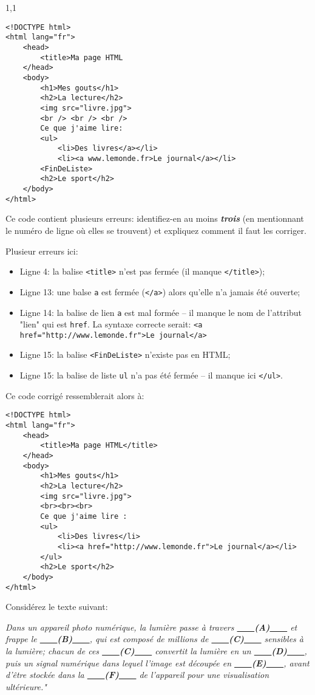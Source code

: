 \documentclass[11pt,a4paper]{exam}
\begin{document}
\begin{spacing}{1,1}
\begin{questions}
\begin{lstlisting}
<!DOCTYPE html>
<html lang="fr">
    <head>
        <title>Ma page HTML
    </head>
    <body>
        <h1>Mes gouts</h1>
        <h2>La lecture</h2>
        <img src="livre.jpg">
        <br /> <br /> <br />
        Ce que j'aime lire:
        <ul>
            <li>Des livres</a></li>
            <li><a www.lemonde.fr>Le journal</a></li>
        <FinDeListe>
        <h2>Le sport</h2>
    </body>
</html>
        	\end{lstlisting}
        		Ce code contient plusieurs erreurs: identifiez-en au moins \textbf{\textit{trois}} (en mentionnant le numéro de ligne où elles se trouvent) et expliquez comment il faut les corriger.
        		\begin{solution}
        			Plusieur erreurs ici:
        			\begin{itemize}
        				\item Ligne 4: la balise \texttt{<title>} n'est pas fermée (il manque \texttt{</title>});
        				\item Ligne 13: une balse \texttt{a} est fermée (\texttt{</a>}) alors qu'elle n'a jamais été ouverte;
        				\item Ligne 14: la balise de lien \texttt{a} est mal formée -- il manque le nom de l'attribut "lien" qui est \texttt{href}. La syntaxe correcte serait:
        				\texttt{<a href="http://www.lemonde.fr">Le journal</a>}
        				\item Ligne 15: la balise \texttt{<FinDeListe>} n'existe pas en HTML;
        				\item Ligne 15: la balise de liste \texttt{ul} n'a pas été fermée -- il manque ici \texttt{</ul>}.
        			\end{itemize}
        			Ce code corrigé ressemblerait alors à:
        			\begin{lstlisting}
<!DOCTYPE html>
<html lang="fr">
    <head>
        <title>Ma page HTML</title>
    </head>
    <body>
        <h1>Mes gouts</h1>
        <h2>La lecture</h2>
        <img src="livre.jpg">
        <br><br><br>
        Ce que j'aime lire :
        <ul>
            <li>Des livres</li>
            <li><a href="http://www.lemonde.fr">Le journal</a></li>
        </ul>
        <h2>Le sport</h2>
    </body>
</html>
				\end{lstlisting}
        		\end{solution}
        		
			\question[3] Considérez le texte suivant:
			
			\textit{Dans un appareil photo numérique, la lumière passe à travers \uline{\ \ \ \ }\textbf{(A)}\uline{\ \ \ \ } et frappe le \uline{\ \ \ \ }\textbf{(B)}\uline{\ \ \ \ }, qui est composé de millions de \uline{\ \ \ \ }\textbf{(C)}\uline{\ \ \ \ } sensibles à la lumière; chacun de ces \uline{\ \ \ \ }\textbf{(C)}\uline{\ \ \ \ } convertit la lumière en un \uline{\ \ \ \ }\textbf{(D)}\uline{\ \ \ \ }, puis un signal numérique dans lequel l'image est découpée en \uline{\ \ \ \ }\textbf{(E)}\uline{\ \ \ \ }, avant d'être stockée dans la \uline{\ \ \ \ }\textbf{(F)}\uline{\ \ \ \ } de l'appareil pour une visualisation ultérieure."}
			

\end{questions}
\end{spacing}
\end{document}
